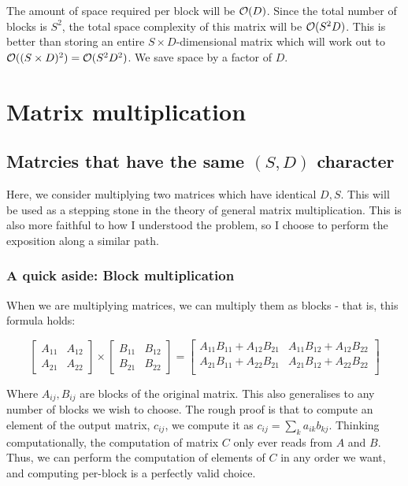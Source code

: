 \documentclass[11pt]{article}
\begin{document}
The amount of space required per block will be $\mathcal{O}(D)$.
Since the total number of blocks is $S^2$, the total space complexity of this
matrix will be $\mathcal{O}(S^2 D)$. This is better than storing an entire 
$S \times D$-dimensional matrix which will work out to 
$\mathcal{O}((S \times D)^2) = \mathcal{O}(S^2 D^2)$. We save space
by a factor of $D$. 

\section{Matrix multiplication}
\subsection{Matrcies that have the same $(S, D)$ character}
Here, we consider multiplying two matrices which have identical $D, S$. This
will be used as a stepping stone in the theory of general matrix multiplication.
This is also more faithful to how I understood the problem, so I choose to 
perform the exposition along a similar path.

\subsubsection{A quick aside: Block multiplication}
When we are multiplying matrices, we can multiply them as blocks - that is,
this formula holds:

$$
\begin{bmatrix}
    A_{11} & A_{12} \\
    A_{21} & A_{22}
\end{bmatrix}
\times
\begin{bmatrix}
    B_{11} & B_{12} \\
    B_{21} & B_{22}

\end{bmatrix}
=
\begin{bmatrix}
    A_{11} B_{11} + A_{12} B_{21} & A_{11} B_{12} + A_{12} B_{22} \\
    A_{21} B_{11} + A_{22} B_{21} & A_{21} B_{12} + A_{22} B_{22} \\
\end{bmatrix}
$$

Where $A_{ij}, B_{ij}$ are blocks of the original matrix. This also
generalises to any number of blocks we wish to choose. The rough proof is
that to compute an element of the output matrix, $c_{ij}$, we compute it as
$c_{ij} = \sum_k a_{ik} b_{kj}$. Thinking computationally, the computation of 
matrix $C$ only ever reads from $A$ and $B$. Thus, we can perform the computation
of elements of $C$ in any order we want, and computing per-block is a perfectly
valid choice.
\end{document}
